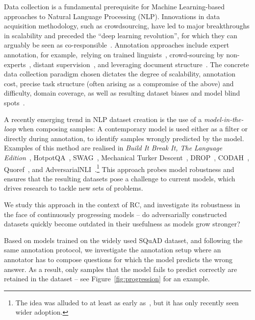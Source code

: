 \documentclass[11pt,a4paper]{article}
\newcommand{\squad}{SQuAD}
\newcommand{\swag}{SWAG}
\newcommand{\hotpot}{HotpotQA}
\newcommand{\drop}{DROP}
\begin{document}
Data collection is a fundamental prerequisite for Machine Learning-based approaches to Natural Language Processing (NLP).
Innovations in data acquisition methodology, such as crowdsourcing, have led to major breakthroughs in scalability and preceded the ``deep learning revolution'', for which they can arguably be seen as co-responsible~\cite{deng2009imagenet,bowman-etal-2015-large,rajpurkar2016squad}.
Annotation approaches include expert annotation, for example,~relying on trained linguists~\cite{marcus1993penntreebank}, crowd-sourcing by non-experts~\cite{snow2008cheap}, distant supervision~\cite{mintz2009distant, joshi-etal-2017-triviaqa},
and leveraging document structure~\cite{herman2015teaching}.
The concrete data collection paradigm chosen dictates the degree of scalability, annotation cost, precise task structure (often arising as a compromise of the above) and difficulty, domain coverage, as well as resulting dataset biases and model blind spots~\cite{jia2017adversarial,schwartz2017effect,gururangan2018annotation}.


A recently emerging trend in NLP dataset creation is the use of a \emph{model-in-the-loop} when composing samples:
A contemporary model is used either as a filter or directly during annotation, to identify samples wrongly predicted by the model.
Examples of this method are realised in \emph{Build It Break It, The Language Edition}~\cite{ettinger2017buildit}, \hotpot{}~\cite{yang2018hotpotqa}, \swag{}~\cite{zellers2018swag}, Mechanical Turker Descent~\cite{yang2018mastering}, \drop{}~\cite{dua2019drop}, CODAH~\cite{chen-etal-2019-codah}, Quoref~\cite{dasigi-etal-2019-quoref}, and AdversarialNLI~\cite{nie2019adversarial}.\footnote{
    The idea was alluded to at least as early as~\citet{richardson2013mctest}, but it has only recently seen wider adoption.
}
This approach probes model robustness and ensures that the resulting datasets pose a challenge to current models, which drives research to tackle new sets of problems.


We study this approach in the context of RC, and investigate its robustness in the face of continuously progressing models -- do adversarially constructed datasets quickly become outdated in their usefulness as models grow stronger? 


Based on models trained on the widely used \squad{} dataset, and following the same annotation protocol, we investigate the annotation setup where an annotator has to compose questions for which the model predicts the wrong answer.
As a result, only samples that the model fails to predict correctly are retained in the dataset -- see Figure~\ref{fig:progression} for an example.
\end{document}
